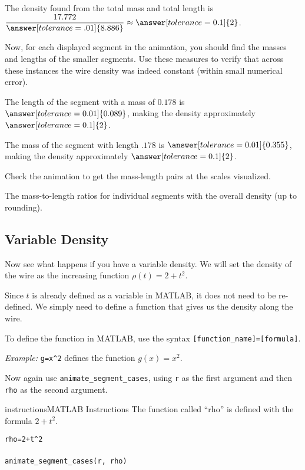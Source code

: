 \documentclass{ximera}
\begin{document}
\begin{problem}
The density found from the total mass and total length is $\dfrac{17.772}{\answer[tolerance=.01]{8.886}} \approx \answer[tolerance=0.1]{2}$.  

Now, for each displayed segment in the animation, you should find the masses and lengths of the smaller segments. Use these measures to verify that across these instances the wire density was indeed constant (within small numerical error).

The length of the segment with a mass of $0.178$ is $\answer[tolerance=0.01]{0.089}$, making the density approximately $\answer[tolerance=0.1]{2}$.

The mass of the segment with length $.178$ is $\answer[tolerance=0.01]{0.355}$, making the density approximately $\answer[tolerance=0.1]{2}$.

\begin{feedback}
Check the animation to get the mass-length pairs at the scales visualized.
\end{feedback}

The mass-to-length ratios for individual segments  with the overall density (up to rounding).
\end{problem}

\subsection*{Variable Density}

Now see what happens if you have a variable density. We will set the density of the wire as the increasing function $\rho(t) = 2 + t^2$.

Since $t$ is already defined as a variable in MATLAB, it does not need to be re-defined. We simply need to define a function that gives us the density along the wire.

\begin{remark}
To define the function in MATLAB, use the syntax \texttt{[function\_name]=[formula]}.

\textit{Example:} \texttt{g=x\^{}2} defines the function $g(x)=x^2$.
\end{remark}

Now again use \texttt{animate\_segment\_cases}, using \texttt{r} as the first argument and then \texttt{rho} as the second argument.

\begin{expandable}{instructions}{MATLAB Instructions}
The function called ``rho'' is defined with the formula $2+t^2$.

\texttt{rho=2+t\^{}2}\\
\\
\texttt{animate\_segment\_cases(r, rho)}
\end{expandable}
\end{document}
